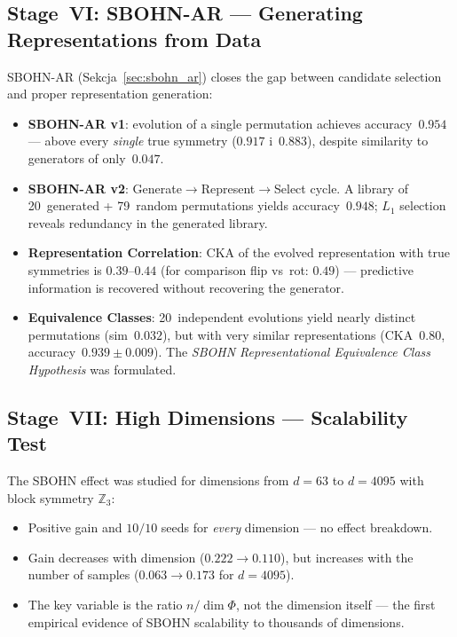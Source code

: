 \documentclass[11pt,a4paper]{report}
\begin{document}
\subsection{Stage~VI: SBOHN-AR --- Generating Representations from Data}

SBOHN-AR (Sekcja~\ref{sec:sbohn_ar}) closes the gap between candidate selection and proper representation generation:
\begin{itemize}
\item \textbf{SBOHN-AR v1}: evolution of a single permutation achieves accuracy~$0.954$ --- above every \emph{single} true symmetry ($0.917$ i~$0.883$), despite similarity to generators of only~$0.047$.
\item \textbf{SBOHN-AR v2}: Generate$\to$Represent$\to$Select cycle. A library of 20~generated + 79~random permutations yields accuracy~$0.948$; $L_1$ selection reveals redundancy in the generated library.
\item \textbf{Representation Correlation}: CKA of the evolved representation with true symmetries is $0.39$--$0.44$ (for comparison flip vs~rot: $0.49$) --- predictive information is recovered without recovering the generator.
\item \textbf{Equivalence Classes}: 20~independent evolutions yield nearly distinct permutations (sim~$0.032$), but with very similar representations (CKA~$0.80$, accuracy~$0.939\pm 0.009$). The \emph{SBOHN Representational Equivalence Class Hypothesis} was formulated.
\end{itemize}

\subsection{Stage~VII: High Dimensions --- Scalability Test}\label{etap:vi}

The SBOHN effect was studied for dimensions from $d=63$ to $d=4095$ with block symmetry $\mathbb{Z}_3$:
\begin{itemize}
\item Positive gain and $10/10$ seeds for \emph{every} dimension --- no effect breakdown.
\item Gain decreases with dimension ($0.222\to 0.110$), but increases with the number of samples ($0.063\to 0.173$ for $d=4095$).
\item The key variable is the ratio $n/\dim\Phi$, not the dimension itself --- the first empirical evidence of SBOHN scalability to thousands of dimensions.
\end{itemize}
\end{document}
